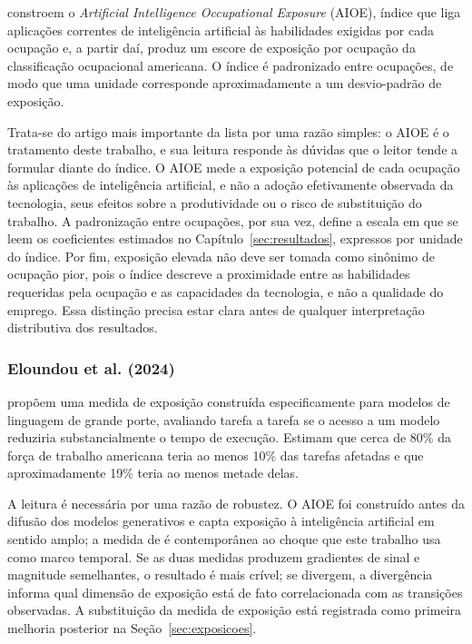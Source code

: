  constroem o \textit{Artificial Intelligence
Occupational Exposure} (AIOE), índice que liga aplicações correntes de
inteligência artificial às habilidades exigidas por cada ocupação e, a partir
daí, produz um escore de exposição por ocupação da classificação ocupacional
americana. O índice é padronizado entre ocupações, de modo que uma unidade
corresponde aproximadamente a um desvio-padrão de exposição.

Trata-se do artigo mais importante da lista por uma razão simples: o AIOE é o
tratamento deste trabalho, e sua leitura responde às dúvidas que o leitor tende
a formular diante do índice. O AIOE mede a exposição potencial de cada ocupação
às aplicações de inteligência artificial, e não a adoção efetivamente observada
da tecnologia, seus efeitos sobre a produtividade ou o risco de substituição do
trabalho. A padronização entre ocupações, por sua vez, define a escala em que se
leem os coeficientes estimados no Capítulo~\ref{sec:resultados}, expressos por unidade do índice. Por fim, exposição elevada não deve ser tomada como
sinônimo de ocupação pior, pois o índice descreve a proximidade entre as
habilidades requeridas pela ocupação e as capacidades da tecnologia, e não a
qualidade do emprego. Essa distinção precisa estar clara antes de qualquer
interpretação distributiva dos resultados.

\subsubsection{Eloundou et al. (2024)}

 propõem uma medida de exposição construída
especificamente para modelos de linguagem de grande porte, avaliando tarefa a
tarefa se o acesso a um modelo reduziria substancialmente o tempo de execução.
Estimam que cerca de 80\% da força de trabalho americana teria ao menos 10\%
das tarefas afetadas e que aproximadamente 19\% teria ao menos metade delas.

A leitura é necessária por uma razão de robustez. O AIOE foi construído antes
da difusão dos modelos generativos e capta exposição à inteligência artificial
em sentido amplo; a medida de  é contemporânea ao
choque que este trabalho usa como marco temporal. Se as duas medidas produzem
gradientes de sinal e magnitude semelhantes, o resultado é mais crível; se
divergem, a divergência informa qual dimensão de exposição está de fato
correlacionada com as transições observadas. A substituição da medida de
exposição está registrada como primeira melhoria posterior na
Seção~\ref{sec:exposicoes}.

